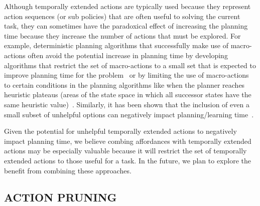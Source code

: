 \documentclass[]{article}
\newcommand{\jmnote}[1]{\textcolor{Green}{\textbf{JM: #1}}}
\begin{document}
Although temporally extended actions are typically used
because they represent action sequences (or sub policies) that are often useful to solving
the current task, they can sometimes have the paradoxical effect
of increasing the planning time because they increase the number of actions that must be explored.
For example, deterministic planning algorithms that successfully make use of macro-actions often avoid the potential increase
in planning time by developing algorithms that restrict the set of macro-actions to a small set that is expected to improve planning time for the problem~\citep{Botea:2005kx,Newton:2005vn} or by limiting the use of macro-actions to certain conditions
in the planning algorithms like when the planner reaches heuristic plateaus (areas of the state space in which all successor states have the same heuristic value)~\citep{Coles:2007ys}. Similarly, it has been shown that the inclusion
of even a small subset of unhelpful options can negatively impact planning/learning time~\citep{Jong:2008zr}.

Given the potential for unhelpful temporally extended actions to negatively impact planning time, we believe combing affordances with temporally extended actions
may be especially valuable because it will restrict the set of temporally extended actions to those
useful for a task. In the future, we plan to explore the benefit from combining
these approaches.



\subsection{ACTION PRUNING}
\end{document}
